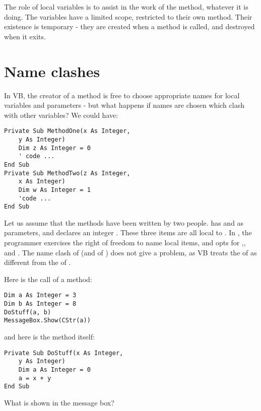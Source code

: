 		The role of local variables is to assist in the work of the method, whatever it is doing. The variables have a limited scope, restricted to their own method. Their existence is temporary - they are created when a method is called, and destroyed when it exits.

		
	\section{Name clashes}
		In VB, the creator of a method is free to choose appropriate names for local variables and parameters - but what happens if names are chosen which clash with other variables? We could have:
		\begin{lstlisting}
Private Sub MethodOne(x As Integer,
	y As Integer)
	Dim z As Integer = 0
	' code ...
End Sub
Private Sub MethodTwo(z As Integer,
	x As Integer)
	Dim w As Integer = 1
	'code ...
End Sub
		\end{lstlisting}
		Let us assume that the methods have been written by two people.  has  and  as parameters, and declares an integer . These three items are all local to . In , the programmer exercises the right of freedom to name local items, and opts for ,, and . The name clash of  (and of ) does not give a problem, as VB treats the  of  as different from the  of .

		\begin{stqb}
			\begin{STQ}
				\item	Here is the call of a method:
					\begin{lstlisting}
Dim a As Integer = 3
Dim b As Integer = 8
DoStuff(a, b)
MessageBox.Show(CStr(a))
					\end{lstlisting}
					and here is the method itself:
					\begin{lstlisting}
Private Sub DoStuff(x As Integer,
	y As Integer)
	Dim a As Integer = 0
	a = x + y
End Sub
					\end{lstlisting}
					What is shown in the message box?
			\end{STQ}
		\end{stqb}


